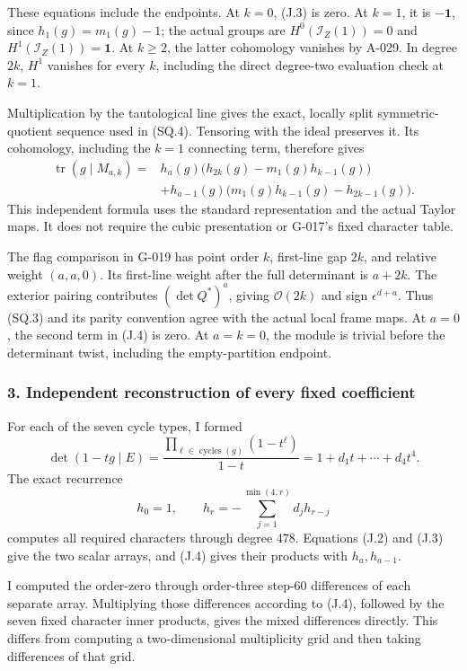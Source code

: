 \documentclass[
  10pt,
]{article}
\begin{document}
These equations include the endpoints. At \(k=0\), (J.3) is zero. At
\(k=1\), it is \(-\mathbf1\), since \(h_1(g)=m_1(g)-1\); the actual
groups are \(H^0(\mathcal I_Z(1))=0\) and
\(H^1(\mathcal I_Z(1))=\mathbf1\). At \(k\ge2\), the latter cohomology
vanishes by A-029. In degree \(2k\), \(H^1\) vanishes for every \(k\),
including the direct degree-two evaluation check at \(k=1\).

Multiplication by the tautological line gives the exact, locally split
symmetric-quotient sequence used in (SQ.4). Tensoring with the ideal
preserves it. Its cohomology, including the \(k=1\) connecting term,
therefore gives \[
\boxed{\begin{aligned}
\operatorname{tr}(g\mid M_{a,k})
={}&h_a(g)\bigl(h_{2k}(g)-m_1(g)h_{k-1}(g)\bigr)\\
&+h_{a-1}(g)\bigl(m_1(g)h_{k-1}(g)-h_{2k-1}(g)\bigr).
\end{aligned}}
\tag{J.4}
\] This independent formula uses the standard representation and the
actual Taylor maps. It does not require the cubic presentation or
G-017's fixed character table.

The flag comparison in G-019 has point order \(k\), first-line gap
\(2k\), and relative weight \((a,a,0)\). Its first-line weight after the
full determinant is \(a+2k\). The exterior pairing contributes
\((\det Q^*)^a\), giving \(\mathcal O(2k)\) and sign \(\epsilon^{d+a}\).
Thus (SQ.3) and its parity convention agree with the actual local frame
maps. At \(a=0\), the second term in (J.4) is zero. At \(a=k=0\), the
module is trivial before the determinant twist, including the
empty-partition endpoint.

\subsubsection{3. Independent reconstruction of every fixed
coefficient}\label{independent-reconstruction-of-every-fixed-coefficient}

For each of the seven cycle types, I formed \[
\det(1-tg\mid E)=
\frac{\prod_{\ell\in\operatorname{cycles}(g)}(1-t^\ell)}{1-t}
=1+d_1t+\cdots+d_4t^4.
\] The exact recurrence \[
h_0=1,\qquad
h_r=-\sum_{j=1}^{\min(4,r)}d_jh_{r-j}
\] computes all required characters through degree 478. Equations (J.2)
and (J.3) give the two scalar arrays, and (J.4) gives their products
with \(h_a,h_{a-1}\).

I computed the order-zero through order-three step-60 differences of
each separate array. Multiplying those differences according to (J.4),
followed by the seven fixed character inner products, gives the mixed
differences directly. This differs from computing a two-dimensional
multiplicity grid and then taking differences of that grid.
\end{document}
